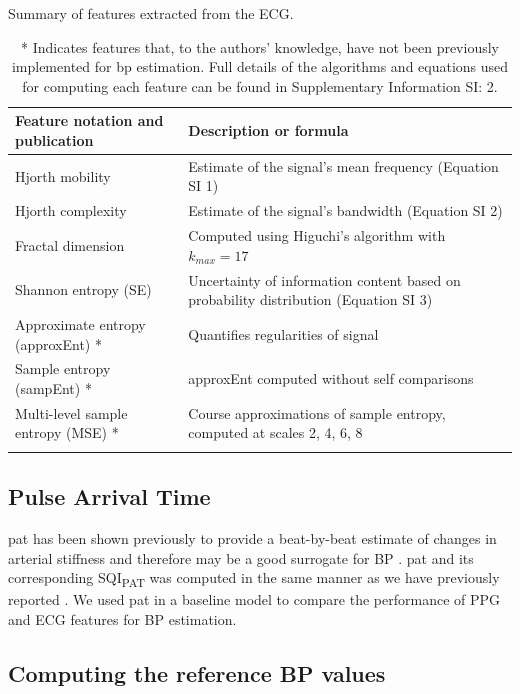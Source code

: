\documentclass[fleqn,10pt]{wlscirep}
\begin{document}
\begin{table}[ht]
	\centering
	\caption{Summary of features extracted from the ECG.}
	\label{tab:ECG_features}
	\begin{tabular}{p{} p{}}
			\textbf{Feature notation and publication} & \textbf{Description or formula} \\
			\hline
			\hline
			Hjorth mobility \cite{Simjanoska2018} & Estimate of the signal's mean frequency (Equation SI 1)\\
			Hjorth complexity \cite{Simjanoska2018} & Estimate of the signal's bandwidth (Equation SI 2)\\
			Fractal dimension \cite{Simjanoska2018} & Computed using Higuchi's algorithm \cite{Higuchi1988} with $k_{max} = 17$\\
			Shannon entropy (SE) \cite{Simjanoska2018} & Uncertainty of information content based on probability distribution (Equation SI 3)\\
			Approximate entropy (approxEnt) * & Quantifies regularities of signal\\
			Sample entropy (sampEnt) * & approxEnt computed without self comparisons\\
			Multi-level sample entropy (MSE) * & Course approximations of sample entropy, computed at scales 2, 4, 6, 8 \\
			\hline
			\\
			\end{tabular}
			\caption*{* Indicates features that, to the authors' knowledge, have not been previously implemented for \ac{bp} estimation. Full details of the algorithms and equations used for computing each feature can be found in Supplementary Information SI: 2. }
\end{table}


\subsection{Pulse Arrival Time}
\ac{pat} has been shown previously to provide a beat-by-beat estimate of changes in arterial stiffness and therefore may be a good surrogate for BP \cite{Finnegan2021}. \ac{pat} and its corresponding SQI\textsubscript{PAT} was computed in the same manner as we have previously reported \cite{Finnegan2021}. We used \ac{pat} in a baseline model to compare the performance of PPG and ECG features for BP estimation. 

\subsection{Computing the reference BP values}
\label{sec:BP_ref}
\end{document}
